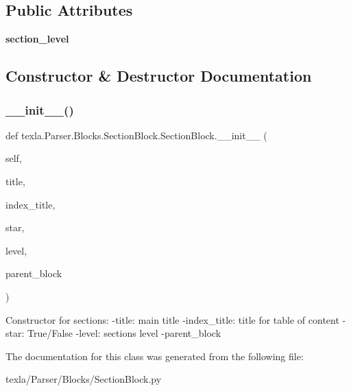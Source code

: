 \subsection*{Public Attributes}
\begin{DoxyCompactItemize}
\item 
\hypertarget{classtexla_1_1Parser_1_1Blocks_1_1SectionBlock_1_1SectionBlock_a71393a9e8917fdafc54f0c463abf1c5e}{}\label{classtexla_1_1Parser_1_1Blocks_1_1SectionBlock_1_1SectionBlock_a71393a9e8917fdafc54f0c463abf1c5e} 
{\bfseries section\+\_\+level}
\end{DoxyCompactItemize}


\subsection{Constructor \& Destructor Documentation}
\hypertarget{classtexla_1_1Parser_1_1Blocks_1_1SectionBlock_1_1SectionBlock_aaaffff6b091aa366f66ecfae3ec7b909}{}\label{classtexla_1_1Parser_1_1Blocks_1_1SectionBlock_1_1SectionBlock_aaaffff6b091aa366f66ecfae3ec7b909} 
\subsubsection{\texorpdfstring{\+\_\+\+\_\+init\+\_\+\+\_\+()}{\_\_init\_\_()}}
{\footnotesize\ttfamily def texla.\+Parser.\+Blocks.\+Section\+Block.\+Section\+Block.\+\_\+\+\_\+init\+\_\+\+\_\+ (\begin{DoxyParamCaption}\item[{}]{self,  }\item[{}]{title,  }\item[{}]{index\+\_\+title,  }\item[{}]{star,  }\item[{}]{level,  }\item[{}]{parent\+\_\+block }\end{DoxyParamCaption})}

\begin{DoxyVerb}Constructor for sections:
-title: main title
-index_title: title for table of content
-star: True/False
-level: sections level
-parent_block
\end{DoxyVerb}
 

The documentation for this class was generated from the following file\+:\begin{DoxyCompactItemize}
\item 
texla/\+Parser/\+Blocks/Section\+Block.\+py\end{DoxyCompactItemize}
